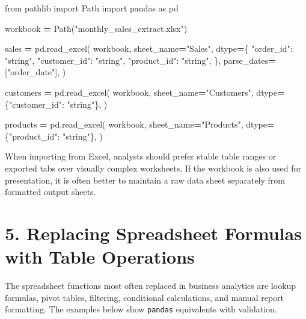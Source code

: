 \documentclass[
  12pt,
]{article}
\newenvironment{Shaded}{\begin{snugshade}}{\end{snugshade}}
\newcommand{\ImportTok}[1]{#1}
\newcommand{\NormalTok}[1]{#1}
\newcommand{\OperatorTok}[1]{\textcolor[rgb]{0.81,0.36,0.00}{\textbf{#1}}}
\newcommand{\StringTok}[1]{\textcolor[rgb]{0.31,0.60,0.02}{#1}}
\begin{document}
\begin{Shaded}
\begin{Highlighting}[]
\ImportTok{from}\NormalTok{ pathlib }\ImportTok{import}\NormalTok{ Path}
\ImportTok{import}\NormalTok{ pandas }\ImportTok{as}\NormalTok{ pd}

\NormalTok{workbook }\OperatorTok{=}\NormalTok{ Path(}\StringTok{"monthly\_sales\_extract.xlsx"}\NormalTok{)}

\NormalTok{sales }\OperatorTok{=}\NormalTok{ pd.read\_excel(}
\NormalTok{    workbook,}
\NormalTok{    sheet\_name}\OperatorTok{=}\StringTok{"Sales"}\NormalTok{,}
\NormalTok{    dtype}\OperatorTok{=}\NormalTok{\{}
        \StringTok{"order\_id"}\NormalTok{: }\StringTok{"string"}\NormalTok{,}
        \StringTok{"customer\_id"}\NormalTok{: }\StringTok{"string"}\NormalTok{,}
        \StringTok{"product\_id"}\NormalTok{: }\StringTok{"string"}\NormalTok{,}
\NormalTok{    \},}
\NormalTok{    parse\_dates}\OperatorTok{=}\NormalTok{[}\StringTok{"order\_date"}\NormalTok{],}
\NormalTok{)}

\NormalTok{customers }\OperatorTok{=}\NormalTok{ pd.read\_excel(}
\NormalTok{    workbook,}
\NormalTok{    sheet\_name}\OperatorTok{=}\StringTok{"Customers"}\NormalTok{,}
\NormalTok{    dtype}\OperatorTok{=}\NormalTok{\{}\StringTok{"customer\_id"}\NormalTok{: }\StringTok{"string"}\NormalTok{\},}
\NormalTok{)}

\NormalTok{products }\OperatorTok{=}\NormalTok{ pd.read\_excel(}
\NormalTok{    workbook,}
\NormalTok{    sheet\_name}\OperatorTok{=}\StringTok{"Products"}\NormalTok{,}
\NormalTok{    dtype}\OperatorTok{=}\NormalTok{\{}\StringTok{"product\_id"}\NormalTok{: }\StringTok{"string"}\NormalTok{\},}
\NormalTok{)}
\end{Highlighting}
\end{Shaded}

When importing from Excel, analysts should prefer stable table ranges or
exported tabs over visually complex worksheets. If the workbook is also
used for presentation, it is often better to maintain a raw data sheet
separately from formatted output sheets.

\section{5. Replacing Spreadsheet Formulas with Table
Operations}\label{replacing-spreadsheet-formulas-with-table-operations}

The spreadsheet functions most often replaced in business analytics are
lookup formulas, pivot tables, filtering, conditional calculations, and
manual report formatting. The examples below show \texttt{pandas}
equivalents with validation.
\end{document}
